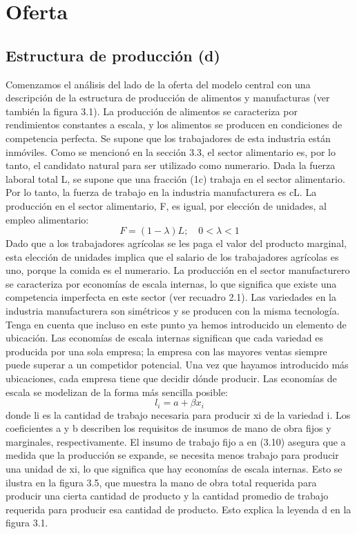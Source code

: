 \section{Oferta}
\subsection{Estructura de producción (d)}
Comenzamos el análisis del lado de la oferta del modelo central con una descripción de la estructura de producción de alimentos y manufacturas (ver también la figura 3.1). La producción de alimentos se caracteriza por rendimientos constantes a escala, y los alimentos se producen en condiciones de competencia perfecta. Se supone que los trabajadores de esta industria están inmóviles. Como se mencionó en la sección 3.3, el sector alimentario es, por lo tanto, el candidato natural para ser utilizado como numerario. Dada la fuerza laboral total L, se supone que una fracción (1c) trabaja en el sector alimentario. Por lo tanto, la fuerza de trabajo en la industria manufacturera es cL. La producción en el sector alimentario, F, es igual, por elección de unidades, al empleo alimentario:
$$F=(1-\lambda)L;\quad 0<\lambda<1$$
Dado que a los trabajadores agrícolas se les paga el valor del producto marginal, esta elección de unidades implica que el salario de los trabajadores agrícolas es uno, porque la comida es el numerario.
La producción en el sector manufacturero se caracteriza por economías de escala internas, lo que significa que existe una competencia imperfecta en este sector (ver recuadro 2.1). Las variedades en la industria manufacturera son simétricos y se producen con la misma tecnología. Tenga en cuenta que incluso en este punto ya hemos introducido un elemento de ubicación. Las economías de escala internas significan que cada variedad es producida por una sola empresa; la empresa con las mayores ventas siempre puede superar a un competidor potencial. Una vez que hayamos introducido más ubicaciones, cada empresa tiene que decidir dónde producir. Las economías de escala se modelizan de la forma más sencilla posible:
$$l_i=a+\beta x_i$$
donde li es la cantidad de trabajo necesaria para producir xi de la variedad i. Los coeficientes a y b describen los requisitos de insumos de mano de obra fijos y marginales, respectivamente. El insumo de trabajo fijo a en (3.10) asegura que a medida que la producción se expande, se necesita menos trabajo para producir una unidad de xi, lo que significa que hay economías de escala internas. Esto se ilustra en la figura 3.5, que muestra la mano de obra total requerida para producir una cierta cantidad de producto y la cantidad promedio de trabajo requerida para producir esa cantidad de producto. Esto explica la leyenda d en la figura 3.1.


